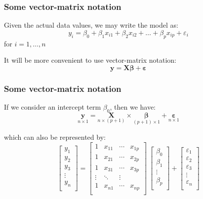 \documentclass[12pt]{beamer}\usepackage[]{graphicx}\usepackage[]{color}
\begin{document}

\begin{frame}
\frametitle{Some vector-matrix notation}

Given the actual data values, we may write the model as:
$$
y_i = \beta_0 + \beta_1 x_{i1} + \beta_2 x_{i2} + \dots + \beta_p x_{ip} + \varepsilon_i
$$
for $i = 1, \dots, n$

\pause
\bigskip
It will be more convenient to use vector-matrix notation:
{\large
$$
\mathbf{y = X \boldsymbol{\beta} + \boldsymbol{\varepsilon}}
$$
}

\end{frame}


\begin{frame}
\frametitle{Some vector-matrix notation}

If we consider an intercept term $\beta_0$, then we have:
$$
\underset{n\times 1}{\mathbf{y}} =  \underset{n\times (p+1)}{\mathbf{X}} \times 
\underset{(p+1)\times 1}{\boldsymbol{\beta}} + \underset{n\times 1}{\boldsymbol{\varepsilon}}
$$

which can also be represented by:
$$
\begin{bmatrix} 
y_1 \\
y_2 \\
y_3 \\
\vdots \\
y_n \\
\end{bmatrix}
=
\begin{bmatrix} 
1 & x_{11} & \cdots & x_{1p} \\
1 & x_{21} & \cdots & x_{2p} \\
1 & x_{31} & \cdots & x_{3p} \\
\vdots & \ddots & \vdots \\
1 & x_{n1} & \cdots & x_{np} \\
\end{bmatrix}
\
\begin{bmatrix} 
\beta_0 \\
\beta_1 \\ 
\vdots \\
\beta_p \\
\end{bmatrix}
+
\begin{bmatrix} 
\varepsilon_1 \\
\varepsilon_2 \\
\varepsilon_3 \\
\vdots \\
\varepsilon_n \\
\end{bmatrix}
$$

\end{frame}
\end{document}
